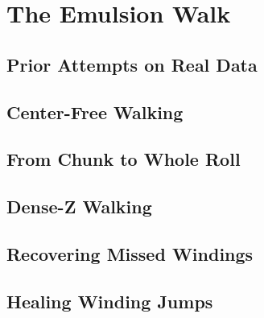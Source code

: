 \chapter{The Emulsion Walk}
\label{chap:emulsion-walk}

\section{Prior Attempts on Real Data}
\label{sec:ew-prior}

\section{Center-Free Walking}
\label{sec:ew-core}

\section{From Chunk to Whole Roll}
\label{sec:ew-wholeroll}

\section{Dense-Z Walking}
\label{sec:ew-densez}

\section{Recovering Missed Windings}
\label{sec:ew-missed}

\section{Healing Winding Jumps}
\label{sec:ew-healing}

